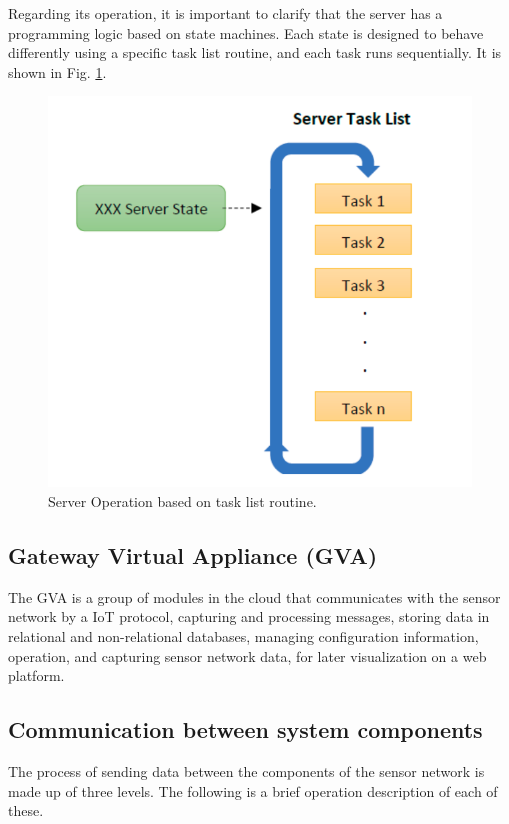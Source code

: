 \documentclass[journal]{IEEEtran}	%
\begin{document}
Regarding its operation, it is important to clarify that the server has a programming logic based on state machines. Each state is designed to behave differently using a specific task list routine, and each task runs sequentially. It is shown in Fig. \ref{fig:server_tasks}.

\begin{figure}[t!]
\centering
\includegraphics[width=0.8\columnwidth]{fig8.png}
\caption{Server Operation based on task list routine.}
\label{fig:server_tasks}
\end{figure}


\subsection{Gateway  Virtual  Appliance (GVA)}


The GVA is a group of modules in the cloud that communicates with the sensor network by a IoT protocol, capturing and processing messages, storing data in relational and non-relational databases, managing configuration information, operation, and capturing sensor network data, for later visualization on a web platform.


\subsection{Communication between system components}


The process of sending data between the components of the sensor network is made up of three levels. The following is a brief operation description of each of these.
\end{document}
